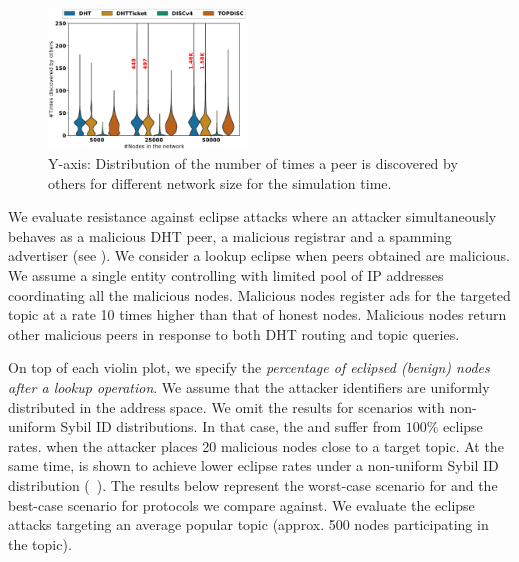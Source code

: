 \begin{figure}[!h]
\includegraphics[width=0.470\textwidth]{results/no_split/violin_size_wasDiscovered.eps}
\caption{Y-axis: Distribution of the number of times a peer is discovered by others for different network size for the simulation time.}
\label{fig:efficiency_size}
\end{figure}
\fi 


We evaluate \sysname resistance against eclipse attacks where an attacker simultaneously behaves as a malicious DHT peer, a malicious registrar and a spamming advertiser (see ). We consider a lookup eclipse when peers obtained are malicious. We assume a single entity controlling with limited pool of IP addresses coordinating all the malicious nodes. 
Malicious nodes register ads for the targeted topic at a rate 10 times higher than that of honest nodes. Malicious nodes return other malicious peers in response to both DHT routing and topic queries. 


On top of each violin plot, we specify the \emph{percentage of eclipsed (benign) nodes after a lookup operation}. We assume that the attacker identifiers are uniformly distributed in the address space. We omit the results for scenarios with non-uniform Sybil ID distributions. In that case, the \altname and \altnameticket suffer from $100\%$ eclipse rates. when the attacker places 20 malicious nodes close to a target topic. At the same time, \sysname is shown to achieve lower eclipse rates under a non-uniform Sybil ID distribution (~). The results below represent the worst-case scenario for \sysname and the best-case scenario for protocols we compare against. 
We evaluate the eclipse attacks targeting an average popular topic (approx.  500 nodes participating in the topic). 


